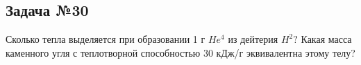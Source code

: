 \subsection{Задача №30}

Сколько тепла выделяется при образовании 1 г $He^4$ из дейтерия $H^2?$ Какая масса каменного угля с теплотворной способностью 30 кДж/г эквивалентна этому телу?